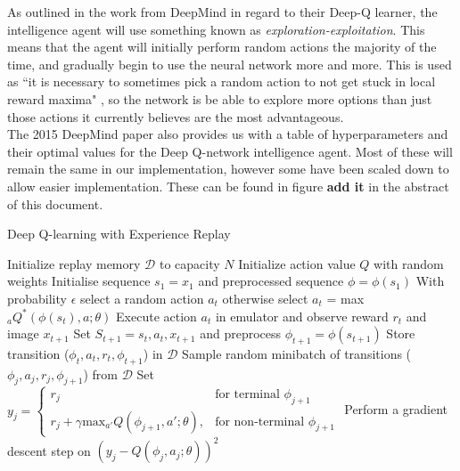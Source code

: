 \documentclass[10pt]{article}
\begin{document}
		As outlined in the work from DeepMind in regard to their Deep-Q learner, the intelligence agent will use something known as \textit{exploration-exploitation}. This means that the agent will initially perform random actions the majority of the time, and gradually begin to use the neural network more and more. This is used as ``it is necessary to sometimes pick a random action to not get stuck in local reward maxima" \cite{repli}, so the network is be able to explore more options than just those actions it currently believes are the most advantageous.\\
		
		The 2015 DeepMind paper also provides us with a table of hyperparameters and their optimal values for the Deep Q-network intelligence agent. Most of these will remain the same in our implementation, however some have been scaled down to allow easier implementation. These can be found in figure \textbf{add it} in the abstract of this document.
		
		\begin{algorithm}
			\caption{Deep Q-learning with Experience Replay \cite{humanlevel}}
			\label{algo:agentAlgo}
			\begin{algorithmic}[]
				\State Initialize replay memory $\mathcal{D}$ to capacity $N$
				\State Initialize action value $Q$ with random weights				
					\State Initialise sequence $s_1 = {x_1}$ and preprocessed sequence $\phi = \phi(s_1)$
						\State With probability $\epsilon$ select a random action $a_t$
						\State otherwise select $a_t$ = max$_aQ^*(\phi(s_t),a;\theta)$
						\State Execute action $a_t$ in emulator and observe reward $r_t$ and image $x_{t+1}$
						\State Set $S_{t+1} = s_t,a_t,x_{t+1}$ and preprocess $\phi_{t+1} = \phi(s_{t+1})$
						\State Store transition ($\phi_t,a_t,r_t,\phi_{t+1}$) in $\mathcal{D}$
						\State Sample random minibatch of transitions ($\phi_j,a_j,r_j,\phi_{j+1}$) from $\mathcal{D}$
						\State Set $y_j =
							\begin{cases}
   								r_j& \text{for terminal } \phi_{j+1}\\
    							r_j + \gamma \text{max}_{a'}Q(\phi_{j+1},a';\theta),& \text{for non-terminal } \phi_{j+1}
							\end{cases}$
						\State Perform a gradient descent step on $(y_j - Q(\phi_j,a_j;\theta))^2$
					\EndFor
				\EndFor
			\end{algorithmic}
		\end{algorithm}
	
\end{document}

